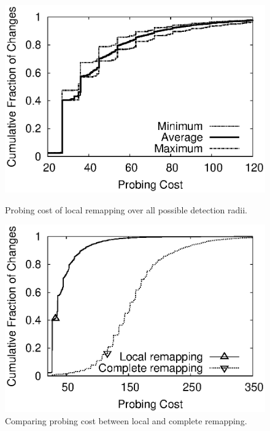 \begin{figure}
\begin{minipage}{0.32\textwidth}
\includegraphics[width=1.05\textwidth]{figs/rmprtcost.eps}
\caption{Probing cost of local remapping over all possible
detection radii.}
\label{fig:sim.rmprt.start}
\end{minipage}
\hfill
\begin{minipage}{0.32\textwidth}
\includegraphics[width=1.05\textwidth]{figs/costprobe.eps}
\caption{Comparing probing cost between local and complete remapping.}
\label{fig:sim.abs.cmp}
\end{minipage}
\hfill
\begin{minipage}{0.32\textwidth}

\end{minipage}
\end{figure}
